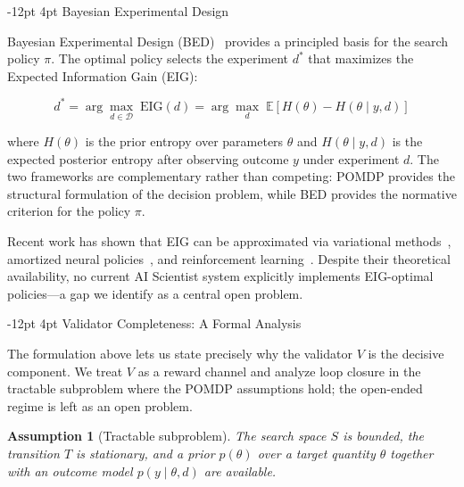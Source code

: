 \documentclass[11pt]{article}
\makeatletter
\newtheorem{assumption}{Assumption}
\renewcommand\subsection{\@startsection{subsection}{2}{\z@}%
  {-12pt \@plus -2pt \@minus -2pt}%
  {4pt \@plus 1pt}%
  {\normalfont\normalsize\bfseries}}
\makeatother
\begin{document}
\subsection{Bayesian Experimental Design}

Bayesian Experimental Design (BED)~\citep{chaloner1995bayesian,rainforth2024modern} provides a principled basis for the search policy $\pi$. The optimal policy selects the experiment $d^*$ that maximizes the Expected Information Gain (EIG):

\begin{equation}
  d^* = \arg\max_{d \in \mathcal{D}}\; \mathrm{EIG}(d) = \arg\max_{d}\; \mathbb{E}\left[H(\theta) - H(\theta \mid y, d)\right]
  \label{eq:eid}
\end{equation}

where $H(\theta)$ is the prior entropy over parameters $\theta$ and $H(\theta \mid y, d)$ is the expected posterior entropy after observing outcome $y$ under experiment $d$. The two frameworks are complementary rather than competing: POMDP provides the structural formulation of the decision problem, while BED provides the normative criterion for the policy $\pi$.

Recent work has shown that EIG can be approximated via variational methods~\citep{foster2019variational}, amortized neural policies~\citep{foster2021dad}, and reinforcement learning~\citep{blau2022rl}. Despite their theoretical availability, no current AI Scientist system explicitly implements EIG-optimal policies---a gap we identify as a central open problem.

\subsection{Validator Completeness: A Formal Analysis}
\label{sec:vformal}

The formulation above lets us state precisely why the validator $V$ is the decisive component. We treat $V$ as a reward channel and analyze loop closure in the tractable subproblem where the POMDP assumptions hold; the open-ended regime is left as an open problem.

\begin{assumption}[Tractable subproblem]
\label{asm:tract}
The search space $S$ is bounded, the transition $T$ is stationary, and a prior $p(\theta)$ over a target quantity $\theta$ together with an outcome model $p(y \mid \theta, d)$ are available.
\end{assumption}
\end{document}
